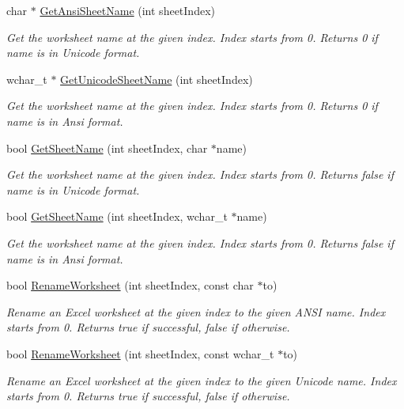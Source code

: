 \begin{DoxyCompactItemize}
char $\ast$ \hyperlink{class_y_excel_1_1_basic_excel_ab7215ce16981e8abae02a57359b6f9cb}{Get\+Ansi\+Sheet\+Name} (int sheet\+Index)
\begin{DoxyCompactList}\small\item\em Get the worksheet name at the given index. Index starts from 0. Returns 0 if name is in Unicode format. \end{DoxyCompactList}\item 
wchar\+\_\+t $\ast$ \hyperlink{class_y_excel_1_1_basic_excel_ac282483b8018ddd8dbf4cd755c158f02}{Get\+Unicode\+Sheet\+Name} (int sheet\+Index)
\begin{DoxyCompactList}\small\item\em Get the worksheet name at the given index. Index starts from 0. Returns 0 if name is in Ansi format. \end{DoxyCompactList}\item 
bool \hyperlink{class_y_excel_1_1_basic_excel_a8b81fcc702b7c656df90c57c7a04b4ac}{Get\+Sheet\+Name} (int sheet\+Index, char $\ast$name)
\begin{DoxyCompactList}\small\item\em Get the worksheet name at the given index. Index starts from 0. Returns false if name is in Unicode format. \end{DoxyCompactList}\item 
bool \hyperlink{class_y_excel_1_1_basic_excel_ac7ccde7ac55faac583344be0bd17d45d}{Get\+Sheet\+Name} (int sheet\+Index, wchar\+\_\+t $\ast$name)
\begin{DoxyCompactList}\small\item\em Get the worksheet name at the given index. Index starts from 0. Returns false if name is in Ansi format. \end{DoxyCompactList}\item 
bool \hyperlink{class_y_excel_1_1_basic_excel_a3d5ec534c692b5db5497a635f068497e}{Rename\+Worksheet} (int sheet\+Index, const char $\ast$to)
\begin{DoxyCompactList}\small\item\em Rename an Excel worksheet at the given index to the given A\+N\+S\+I name. Index starts from 0. Returns true if successful, false if otherwise. \end{DoxyCompactList}\item 
bool \hyperlink{class_y_excel_1_1_basic_excel_a56fe58032e4e985a69f66a61295dbbe0}{Rename\+Worksheet} (int sheet\+Index, const wchar\+\_\+t $\ast$to)
\begin{DoxyCompactList}\small\item\em Rename an Excel worksheet at the given index to the given Unicode name. Index starts from 0. Returns true if successful, false if otherwise. \end{DoxyCompactList}\item 

\end{DoxyCompactItemize}
